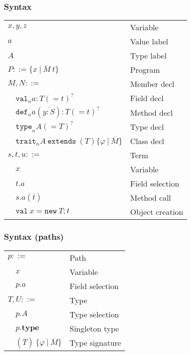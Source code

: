 \documentclass[aspectratio=169]{beamer}
\begin{document}
\begin{frame}
\frametitle{Syntax}
\begin{tabular}{ll}
  $x, y, z$ & Variable \\
  $a$ & Value label \\
  $A$ & Type label \\
  $P ::= \{x\ |\ \overline{M}\ t\}$ & Program \\
  
  $M, N ::=$ & Member decl \\
  $\quad \texttt{val}_na : T (= t)^?$ & \quad Field decl \\
  $\quad \texttt{def}_na ( \overline{y : S} ) : T ( = t)^?$ & \quad Method decl \\
  $\quad \texttt{type}_nA (= T)^?$ & \quad Type decl \\
  $\quad \texttt{trait}_nA\ \texttt{extends}\ (T) \{ \varphi\ |\ \overline{M} \}$ & \quad Class decl \\
  
  $s, t, u ::=$ & Term \\
  $\quad x$ & \quad Variable \\
  $\quad t.a$ & \quad Field selection \\
  $\quad s.a(\overline{t})$ & \quad Method call \\
  $\quad \texttt{val}\ x = \texttt{new}\ T;t$ & Object creation \\
\end{tabular}
\end{frame}

\begin{frame}
\frametitle{Syntax (paths)}
\begin{tabular}{ll}
$p ::=$ & Path \\
$\quad x$ & \quad Variable \\
$\quad p.a$ & \quad Field selection \\

$T,U ::=$ & Type \\
$\quad p.A$ & \quad Type selection \\
$\quad p.\textbf{type}$ & \quad Singleton type \\
$\quad (\overline{T})\ \{\varphi\ |\ \overline{M}\}$ & \quad Type signature \\
\end{tabular}
\end{frame}
\end{document}
